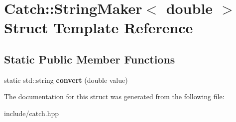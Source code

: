 \hypertarget{structCatch_1_1StringMaker_3_01double_01_4}{}\section{Catch\+:\+:String\+Maker$<$ double $>$ Struct Template Reference}
\label{structCatch_1_1StringMaker_3_01double_01_4}
\subsection*{Static Public Member Functions}
\begin{DoxyCompactItemize}
\item 
static std\+::string {\bfseries convert} (double value)\hypertarget{structCatch_1_1StringMaker_3_01double_01_4_acaa61529acad2462292c747d34e5f3d2}{}\label{structCatch_1_1StringMaker_3_01double_01_4_acaa61529acad2462292c747d34e5f3d2}

\end{DoxyCompactItemize}


The documentation for this struct was generated from the following file\+:\begin{DoxyCompactItemize}
\item 
include/catch.\+hpp\end{DoxyCompactItemize}
